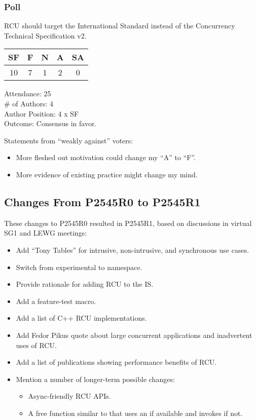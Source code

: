 \subsubsection{Poll}
\label{sec:LEWG-2022-09-20:Poll}

RCU should target the International Standard instead of the Concurrency Technical Specification v2.

\begin{tabular}{c|c|c|c|c}
SF & F &  N & A & SA \\
\hline
10 & 7 &  1 & 2 &  0 \\
\end{tabular}

Attendance: 25 \\
\# of Authors: 4 \\
Author Position: 4 x SF \\
Outcome: Consensus in favor.

Statements from ``weakly against'' voters:

\begin{itemize}
\item	More fleshed out motivation could change my ``A'' to ``F''.
\item	More evidence of existing practice might change my mind.
\end{itemize}

\subsection{Changes From P2545R0 to P2545R1}
\label{sec:Changes From P2545R0 to P2545R1}

These changes to P2545R0 resulted in P2545R1, based on discussions
in virtual SG1 and LEWG meetings:

\begin{itemize}
\item	Add ``Tony Tables'' for intrusive, non-intrusive, and
	synchronous use cases.
\item	Switch from experimental to  namespace.
\item	Provide rationale for adding RCU to the IS.
\item	Add a feature-test macro.
\item	Add a list of C++ RCU implementations.
\item	Add Fedor Pikus quote about large concurrent applications
	and inadvertent uses of RCU.
\item	Add a list of publications showing performance benefits of RCU.
\item	Mention a number of longer-term possible changes:
	\begin{itemize}
	\item	Async-friendly RCU APIs.
	\item	A free function similar to  that
		uses an  if available and invokes
		 if not.
	\end{itemize}
\end{itemize}

